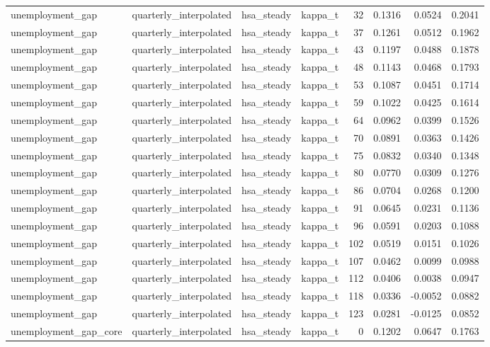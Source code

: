 \begin{tabular}{llllrrrr}
unemployment\_gap & quarterly\_interpolated & hsa\_steady & kappa\_t & 32 & 0.1316 & 0.0524 & 0.2041 \\
unemployment\_gap & quarterly\_interpolated & hsa\_steady & kappa\_t & 37 & 0.1261 & 0.0512 & 0.1962 \\
unemployment\_gap & quarterly\_interpolated & hsa\_steady & kappa\_t & 43 & 0.1197 & 0.0488 & 0.1878 \\
unemployment\_gap & quarterly\_interpolated & hsa\_steady & kappa\_t & 48 & 0.1143 & 0.0468 & 0.1793 \\
unemployment\_gap & quarterly\_interpolated & hsa\_steady & kappa\_t & 53 & 0.1087 & 0.0451 & 0.1714 \\
unemployment\_gap & quarterly\_interpolated & hsa\_steady & kappa\_t & 59 & 0.1022 & 0.0425 & 0.1614 \\
unemployment\_gap & quarterly\_interpolated & hsa\_steady & kappa\_t & 64 & 0.0962 & 0.0399 & 0.1526 \\
unemployment\_gap & quarterly\_interpolated & hsa\_steady & kappa\_t & 70 & 0.0891 & 0.0363 & 0.1426 \\
unemployment\_gap & quarterly\_interpolated & hsa\_steady & kappa\_t & 75 & 0.0832 & 0.0340 & 0.1348 \\
unemployment\_gap & quarterly\_interpolated & hsa\_steady & kappa\_t & 80 & 0.0770 & 0.0309 & 0.1276 \\
unemployment\_gap & quarterly\_interpolated & hsa\_steady & kappa\_t & 86 & 0.0704 & 0.0268 & 0.1200 \\
unemployment\_gap & quarterly\_interpolated & hsa\_steady & kappa\_t & 91 & 0.0645 & 0.0231 & 0.1136 \\
unemployment\_gap & quarterly\_interpolated & hsa\_steady & kappa\_t & 96 & 0.0591 & 0.0203 & 0.1088 \\
unemployment\_gap & quarterly\_interpolated & hsa\_steady & kappa\_t & 102 & 0.0519 & 0.0151 & 0.1026 \\
unemployment\_gap & quarterly\_interpolated & hsa\_steady & kappa\_t & 107 & 0.0462 & 0.0099 & 0.0988 \\
unemployment\_gap & quarterly\_interpolated & hsa\_steady & kappa\_t & 112 & 0.0406 & 0.0038 & 0.0947 \\
unemployment\_gap & quarterly\_interpolated & hsa\_steady & kappa\_t & 118 & 0.0336 & -0.0052 & 0.0882 \\
unemployment\_gap & quarterly\_interpolated & hsa\_steady & kappa\_t & 123 & 0.0281 & -0.0125 & 0.0852 \\
unemployment\_gap\_core & quarterly\_interpolated & hsa\_steady & kappa\_t & 0 & 0.1202 & 0.0647 & 0.1763 \\

\end{tabular}
